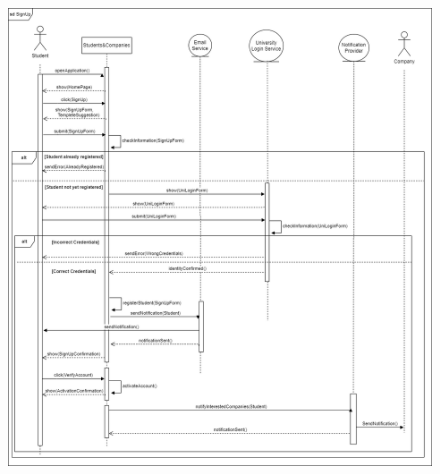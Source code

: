 \documentclass[a4paper,12pt]{article}
\begin{document}
\begin{figure}[H]
    \hspace*{-2cm} %
    \includegraphics[scale = 0.45]{figures/UseCasesSD/StudentSignUpSD.drawio.png}\\
\end{figure}
\end{document}
